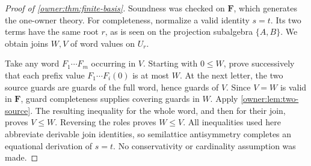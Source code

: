 \begin{proof}[Proof of \cref{owner:thm:finite-basis}]
Soundness was checked on $\mathbf F$, which generates the
one-owner theory. For completeness, normalize a valid identity
$s=t$. Its two terms have the same root $r$, as is seen on the
projection subalgebra $\{A,B\}$. We obtain joins $W,V$ of word
values on $U_r$.

Take any word $F_1\cdots F_m$ occurring in $V$. Starting with
$0\leq W$, prove successively that each prefix value
$F_1\cdots F_i(0)$ is at most $W$. At the next letter, the two
source guards are guards of the full word, hence guards of $V$.
Since $V=W$ is valid in $\mathbf F$, guard completeness supplies
covering guards in $W$. Apply \cref{owner:lem:two-source}.
The resulting inequality for the whole word, and then for their
join, proves $V\leq W$. Reversing the roles proves $W\leq V$.
All inequalities used here abbreviate derivable join identities,
so semilattice antisymmetry completes an equational derivation
of $s=t$. No conservativity or cardinality assumption was made.
\end{proof}
